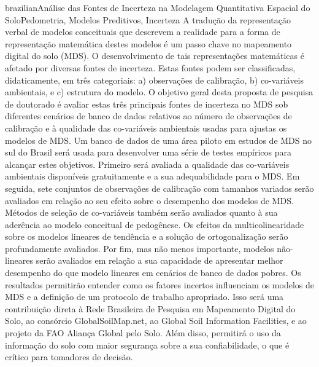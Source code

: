 \documentclass[tese,english]{UFRuralRJ}
\begin{document}
\def\tituloportugues{Análise das Fontes de Incerteza na Modelagem Quantitativa 
  Espacial do Solo}
\def\chavesportugues{Pedometria, Modelos Preditivos, Incerteza}
\generalabstracttrue
\begin{generalabstract}{brazilian}{\tituloportugues}{\chavesportugues}
A tradução da representação verbal de modelos conceituais que descrevem a 
realidade para a forma de representação matemática destes modelos é um passo 
chave no mapeamento digital do solo (MDS). O desenvolvimento de tais 
representações matemáticas é afetado por diversas fontes de incerteza. Estas 
fontes podem ser classificadas, didaticamente, em três categoriais: a) 
observações de calibração, b) co-variáveis ambientais, e c) estrutura do 
modelo. O objetivo geral desta proposta de pesquisa de doutorado é avaliar 
estas três principais fontes de incerteza no MDS sob diferentes cenários de 
banco de dados relativos ao número de observações de calibração e à qualidade 
das co-variáveis ambientais usadas para ajustas os modelos de MDS. Um banco de
dados de uma área piloto em estudos de MDS no sul do Brasil será usada para 
desenvolver uma série de testes empíricos para alcançar estes objetivos. 
Primeiro será avaliada a qualidade das co-variáveis ambientais disponíveis 
gratuitamente e a sua adequabilidade para o MDS. Em seguida, sete conjuntos 
de observações de calibração com tamanhos variados serão avaliados em relação 
ao seu efeito sobre o desempenho dos modelos de MDS. Métodos de seleção de 
co-variáveis também serão avaliados quanto à sua aderência ao modelo conceitual
de pedogênese. Os efeitos da multicolinearidade sobre os modelos lineares de 
tendência e a solução de ortogonalização serão profundamente avaliados. Por 
fim, mas não menos importante, modelos não-lineares serão avaliados em relação 
a sua capacidade de apresentar melhor desempenho do que modelo lineares em 
cenários de banco de dados pobres. Os resultados permitirão entender como os 
fatores incertos influenciam os modelos de MDS e a definição de um protocolo 
de trabalho apropriado. Isso será uma contribuição direta à Rede Brasileira de 
Pesquisa em Mapeamento Digital do Solo, ao consórcio GlobalSoilMap.net, ao 
Global Soil Information Facilities, e ao projeto da FAO Aliança Global pelo 
Solo. Além disso, permitirá o uso da informação do solo com maior segurança 
sobre a sua confiabilidade, o que é crítico para tomadores de decisão.
\end{generalabstract}
\end{document}
